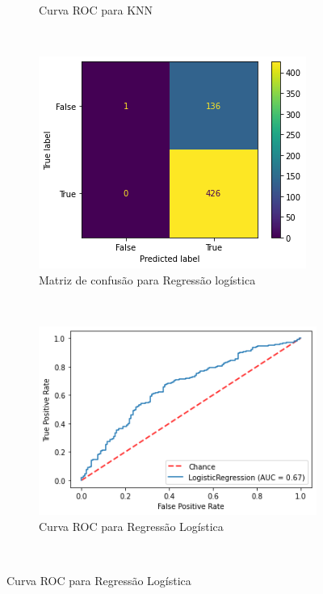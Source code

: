 \begin{figure}[htb]
\begin{subfigure}[b]{0.45\textwidth}
        \caption{Curva ROC para KNN}
        \label{fig:resultados:base-de-dados-28.3.6-roc-curve-knn-monthly-cnae}
    \end{subfigure} ~ \\
    \centering 
    \begin{subfigure}[b]{0.45\textwidth}
        \includegraphics[scale=0.45]{images/base-de-dados-28.3.7-confusion-matrix-logregression-monthly-cnae.png}
        \caption{Matriz de confusão para Regressão logística}
        \label{fig:resultados:base-de-dados-28.3.7-confusion-matrix-logregression-monthly-cnae}
    \end{subfigure} ~ \quad
    \begin{subfigure}[b]{0.45\textwidth}
        \includegraphics[scale=0.45]{images/base-de-dados-28.3.8-roc-curve-logregression-monthly-cnae.png}
        \caption{Curva ROC para Regressão Logística}
        \label{fig:resultados:base-de-dados-28.3.8-roc-curve-logregression-monthly-cnae}
    \end{subfigure} ~ \\
    \fdadospesquisa
\end{figure}

